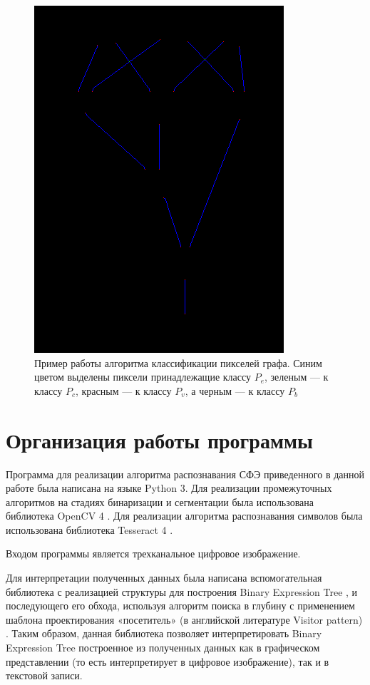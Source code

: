 \documentclass[makeidx, a4paper, 14pt]{extarticle}
\begin{document}
\begin{figure}[H]
    \centering
    \includegraphics[scale=1]{img4_classified.png}
    \caption{Пример работы алгоритма классификации пикселей графа. Синим цветом выделены пиксели принадлежащие классу $P_e$, зеленым --- к классу $P_c$, красным --- к классу $P_v$, а черным --- к классу $P_b$ }
    \label{fig:img4_classified}
\end{figure}

\section{Организация работы программы}
Программа для реализации алгоритма распознавания СФЭ приведенного в данной работе была написана на языке Python 3.
Для реализации промежуточных алгоритмов на стадиях бинаризации и сегментации была использована библиотека OpenCV 4 \cite{opencv4}.
Для реализации алгоритма распознавания символов была использована библиотека Tesseract 4 \cite{tesseract}.

Входом программы является трехканальное цифровое изображение.

Для интерпретации полученных данных была написана вспомогательная библиотека с реализацией структуры для построения Binary Expression Tree \cite{binary_tree},
и последующего его обхода, используя алгоритм поиска в глубину \cite{dfs} с применением шаблона проектирования «посетитель» (в английской литературе Visitor pattern) \cite{visitor}.
Таким образом, данная библиотека позволяет интерпретировать Binary Expression Tree построенное из полученных данных как в графическом представлении (то есть интерпретирует в цифровое изображение),
так и в текстовой записи.
\end{document}
